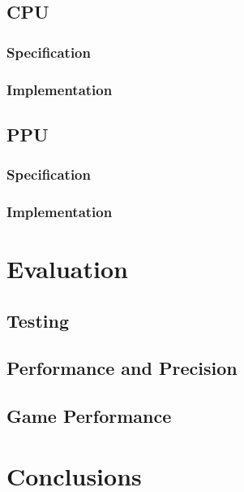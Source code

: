 \documentclass[]{report}
\begin{document}
\section{CPU}

\subsection{Specification}

\subsection{Implementation}

\section{PPU}

\subsection{Specification}

\subsection{Implementation}

\chapter{Evaluation}

\section {Testing}

\section{Performance and Precision}

\section{Game Performance}

\chapter{Conclusions}

\begin{abstract}
\end{abstract}
\end{document}
